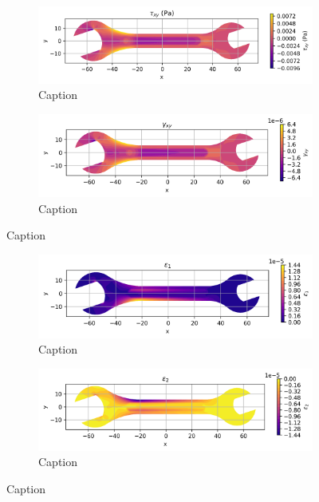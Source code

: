 \documentclass{article}  %
\begin{document}
\begin{figure}[H]
  \centering
  \begin{subfigure}[t]{0.49\textwidth}
    \centering
    \includegraphics[width=\textwidth]{GRAFICOS/Case d - tau_xy.png}
    \caption{Caption}
    \label{fig:deformada_reacciones}
  \end{subfigure}
  \hfill
  \begin{subfigure}[t]{0.49\textwidth}
    \centering
    \includegraphics[width=\textwidth]{GRAFICOS/Case d - gamma_xy.png}
    \caption{Caption}
    \label{fig:von_mises}
  \end{subfigure}
  \caption{Caption}
  \label{fig:analisis_estructural}
\end{figure}

\begin{figure}[H]
  \centering
  \begin{subfigure}[t]{0.49\textwidth}
    \centering
    \includegraphics[width=\textwidth]{GRAFICOS/Case d - epsilon_1.png}
    \caption{Caption}
    \label{fig:deformada_reacciones}
  \end{subfigure}
  \hfill
  \begin{subfigure}[t]{0.49\textwidth}
    \centering
    \includegraphics[width=\textwidth]{GRAFICOS/Case d - epsilon_2.png}
    \caption{Caption}
    \label{fig:von_mises}
  \end{subfigure}
  \caption{Caption}
  \label{fig:analisis_estructural}
\end{figure}
\end{document}

